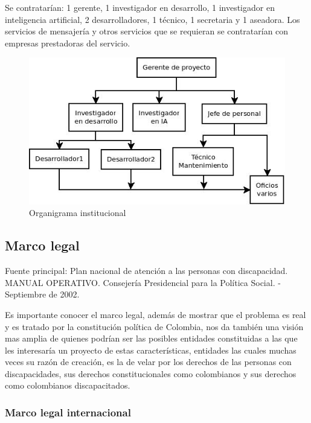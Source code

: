 \documentclass[a4paper, 12pt, oneside]{article}
\begin{document}
	Se contratarían: 1 gerente, 1 investigador en desarrollo, 1 investigador en inteligencia artificial, 2 desarrolladores, 1 técnico, 1 secretaria y 1 aseadora. Los servicios de mensajería y otros servicios que se requieran se contratarían con empresas prestadoras del servicio.
		
	\begin{figure}
	\begin{center}
	\leavevmode
	\includegraphics[width=12cm]{img/org.jpg}
	\end{center}
	\caption{Organigrama institucional}
	\label{fig:org}
	\end{figure}
	
		
	\subsection{Marco legal}

	Fuente principal: Plan nacional de atención a las personas con discapacidad. MANUAL OPERATIVO. Consejería Presidencial para la Política Social. - Septiembre de 2002.

	Es importante conocer el marco legal, además de mostrar que el problema es real y es tratado por la constitución política de Colombia, nos da también una visión mas amplia de quienes podrían ser las posibles entidades constituidas a las que les interesaría un proyecto de estas características, entidades las cuales muchas veces su razón de creación, es la de velar por los derechos de las personas con discapacidades, sus derechos constitucionales como colombianos y sus derechos como colombianos discapacitados. 


	\subsubsection{Marco legal internacional}
\end{document}
